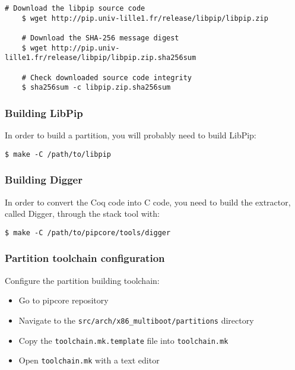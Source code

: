 \documentclass[10pt,a4paper,titlepage]{refart}
\begin{document}
\begin{lstlisting}[style=BashStyle]
    # Download the libpip source code
    $ wget http://pip.univ-lille1.fr/release/libpip/libpip.zip

    # Download the SHA-256 message digest
    $ wget http://pip.univ-lille1.fr/release/libpip/libpip.zip.sha256sum

    # Check downloaded source code integrity
    $ sha256sum -c libpip.zip.sha256sum
\end{lstlisting}

\subsubsection{Building LibPip}

In order to build a partition, you will probably need to build LibPip:

\begin{lstlisting}[style=BashStyle]
    $ make -C /path/to/libpip
\end{lstlisting}

\subsubsection{Building Digger}

In order to convert the Coq code into C code, you need to build the extractor,
called Digger, through the stack tool with:

\begin{lstlisting}[style=BashStyle]
    $ make -C /path/to/pipcore/tools/digger
\end{lstlisting}

\subsubsection{Partition toolchain configuration}

Configure the partition building toolchain:

\begin{itemize}
\item Go to pipcore repository
\item Navigate to the \texttt{src/arch/x86\_multiboot/partitions} directory
\item Copy the \texttt{toolchain.mk.template} file into \texttt{toolchain.mk}
\item Open \texttt{toolchain.mk} with a text editor
\end{itemize}
\end{document}
